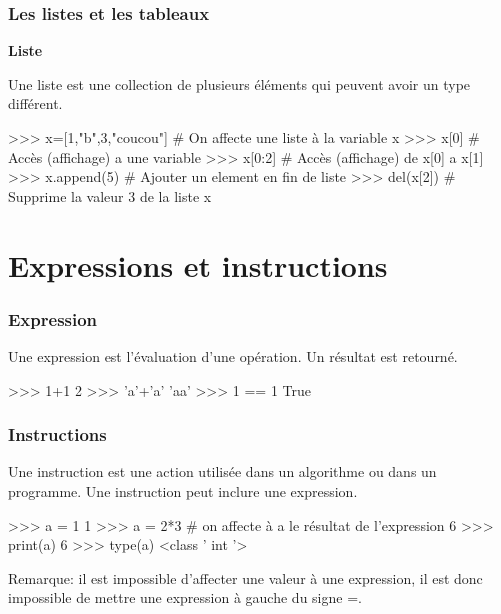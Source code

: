 \begin{frame}[fragile]
\frametitle{Les listes et les tableaux}

\textbf{Liste}

Une liste est une collection de plusieurs éléments qui peuvent avoir un type différent.

\begin{GrayBox}[0.85\textwidth]
\begin{verbatimtab}[3]
>>> x=[1,"b",3,"coucou"] # On affecte une liste à la variable x
>>> x[0] # Accès (affichage) a une variable
>>> x[0:2] # Accès (affichage) de x[0] a x[1]
>>> x.append(5) # Ajouter un element en fin de liste
>>> del(x[2]) # Supprime la valeur 3 de la liste x	
\end{verbatimtab}
\end{GrayBox}
\end{frame}

\section{Expressions et instructions} 


\begin{frame}[fragile]
\frametitle{Expression}

Une expression est l'évaluation d'une opération. Un résultat est retourné.

\begin{GrayBox}[0.75\textwidth]
\begin{verbatimtab}[3]
>>> 1+1
	2
>>> 'a'+'a'
	'aa'
>>> 1 == 1
	True
\end{verbatimtab}
\end{GrayBox}
\end{frame}

\begin{frame}[fragile]
\frametitle{Instructions}

Une instruction est une action utilisée dans un algorithme ou dans un programme. Une instruction peut inclure une expression.

\begin{GrayBox}[0.75\textwidth]
\begin{verbatimtab}[3]
>>> a = 1
	1
>>> a = 2*3 # on affecte à a le résultat de l'expression
	6
>>> print(a)
	6
>>> type(a)
	<class ' int '>
\end{verbatimtab}
\end{GrayBox}

Remarque: il est impossible d'affecter une valeur à une expression, il est donc impossible de mettre une expression à gauche du signe =.

\end{frame}

